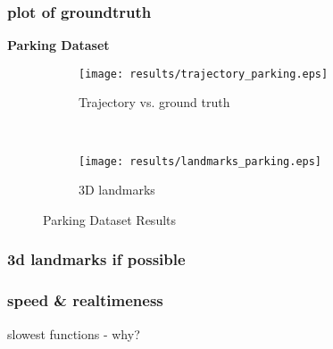 \subsubsection{plot of groundtruth}
\textbf{Parking Dataset}
\begin{figure*}[ht!]
    \centering
    \begin{subfigure}[t]{0.5\textwidth}
        \centering
        \texttt{[image: results/trajectory\_parking.eps]}
        \caption{Trajectory vs. ground truth}
    \end{subfigure}%
    ~ 
    \begin{subfigure}[t]{0.5\textwidth}
        \centering
        \texttt{[image: results/landmarks\_parking.eps]}
        \caption{3D landmarks}
    \end{subfigure}
    \caption{Parking Dataset Results}
		\label{parking_result_fig}
\end{figure*}

\subsubsection{3d landmarks if possible}

\subsubsection{speed \& realtimeness}
slowest functions - why?

